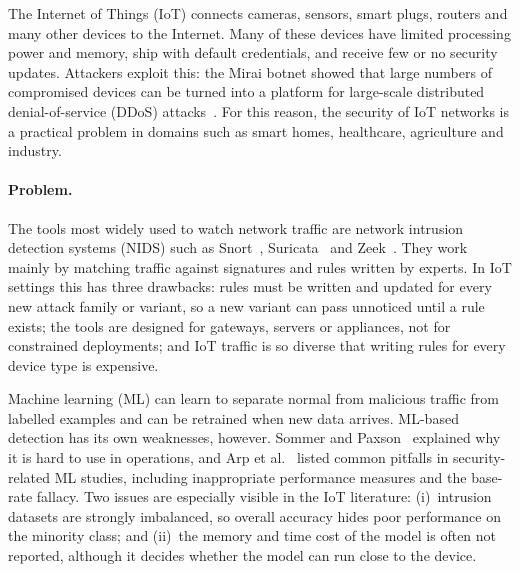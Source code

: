 \documentclass[runningheads]{llncs}
\begin{document}
The Internet of Things (IoT) connects cameras, sensors, smart plugs, routers and many other devices to the Internet. Many of these devices have limited processing power and memory, ship with default credentials, and receive few or no security updates. Attackers exploit this: the Mirai botnet showed that large numbers of compromised devices can be turned into a platform for large-scale distributed denial-of-service (DDoS) attacks~\cite{antonakakis2017,kolias2017}. For this reason, the security of IoT networks is a practical problem in domains such as smart homes, healthcare, agriculture and industry.

\paragraph{Problem.} The tools most widely used to watch network traffic are network intrusion detection systems (NIDS) such as Snort~\cite{roesch1999}, Suricata~\cite{suricata} and Zeek~\cite{paxson1999}. They work mainly by matching traffic against signatures and rules written by experts. In IoT settings this has three drawbacks: rules must be written and updated for every new attack family or variant, so a new variant can pass unnoticed until a rule exists; the tools are designed for gateways, servers or appliances, not for constrained deployments; and IoT traffic is so diverse that writing rules for every device type is expensive.

Machine learning (ML) can learn to separate normal from malicious traffic from labelled examples and can be retrained when new data arrives. ML-based detection has its own weaknesses, however. Sommer and Paxson~\cite{sommer2010} explained why it is hard to use in operations, and Arp et al.~\cite{arp2022} listed common pitfalls in security-related ML studies, including inappropriate performance measures and the base-rate fallacy. Two issues are especially visible in the IoT literature: (i)~intrusion datasets are strongly imbalanced, so overall accuracy hides poor performance on the minority class; and (ii)~the memory and time cost of the model is often not reported, although it decides whether the model can run close to the device.
\end{document}

